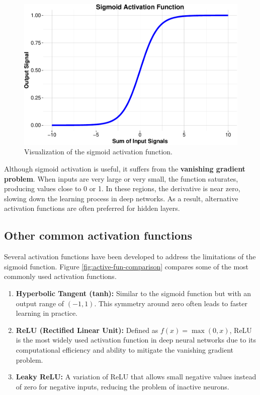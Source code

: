 \documentclass[
]{book}
\providecommand{\tightlist}{%
  \setlength{\itemsep}{0pt}\setlength{\parskip}{0pt}}
\theoremstyle{definition}
\theoremstyle{definition}
\theoremstyle{definition}
\theoremstyle{definition}
\theoremstyle{remark}
\begin{document}
\begin{figure}

{\centering \includegraphics[width=0.5\linewidth]{nn_files/figure-latex/active-fun-sigmoid-1} 

}

\caption{Visualization of the sigmoid activation function.}\label{fig:active-fun-sigmoid}
\end{figure}

Although sigmoid activation is useful, it suffers from the \textbf{vanishing gradient problem}. When inputs are very large or very small, the function saturates, producing values close to 0 or 1. In these regions, the derivative is near zero, slowing down the learning process in deep networks. As a result, alternative activation functions are often preferred for hidden layers.

\subsection*{Other common activation functions}\label{other-common-activation-functions}

Several activation functions have been developed to address the limitations of the sigmoid function. Figure \ref{fig:active-fun-comparison} compares some of the most commonly used activation functions.

\begin{enumerate}
\def\labelenumi{\arabic{enumi}.}
\tightlist
\item
  \textbf{Hyperbolic Tangent (tanh):} Similar to the sigmoid function but with an output range of \((-1, 1)\). This symmetry around zero often leads to faster learning in practice.\\
\item
  \textbf{ReLU (Rectified Linear Unit):} Defined as \(f(x) = \max(0, x)\), ReLU is the most widely used activation function in deep neural networks due to its computational efficiency and ability to mitigate the vanishing gradient problem.\\
\item
  \textbf{Leaky ReLU:} A variation of ReLU that allows small negative values instead of zero for negative inputs, reducing the problem of inactive neurons.
\end{enumerate}
\end{document}
